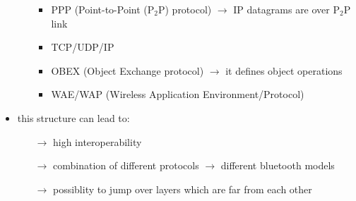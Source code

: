 \begin{itemize}
\begin{itemize}
\begin{itemize}
            \item PPP (Point-to-Point (P$_2$P) protocol) $\rightarrow$ IP datagrams are over P$_2$P link
            \item TCP/UDP/IP
            \item OBEX (Object Exchange protocol) $\rightarrow$ it defines object operations
            \item WAE/WAP (Wireless Application Environment/Protocol)
        \end{itemize} 
    \end{itemize}
    \item this structure can lead to:
    \begin{itemize}
        \item[$\rightarrow$] high interoperability
        \item[$\rightarrow$] combination of different protocols $\rightarrow$ different bluetooth models
        \item[$\rightarrow$] possiblity to jump over layers which are far from each other
    \end{itemize}
\end{itemize}

